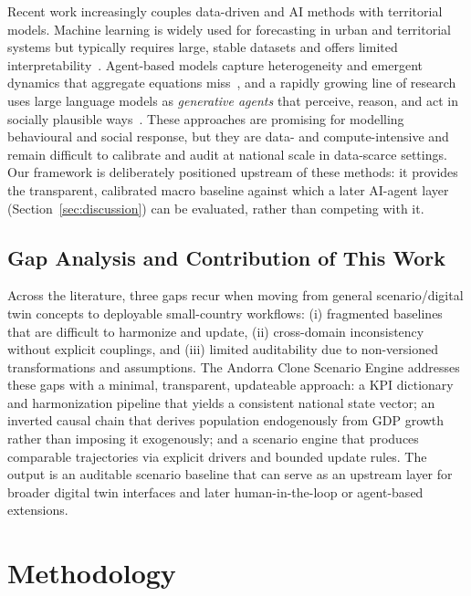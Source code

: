 \documentclass[urbansci,article,submit,pdftex,moreauthors]{Definitions/mdpi}
\begin{document}
Recent work increasingly couples data-driven and AI methods with territorial models.
Machine learning is widely used for forecasting in urban and territorial systems but
typically requires large, stable datasets and offers limited
interpretability~\cite{batty2018digitaltwins}. Agent-based models capture
heterogeneity and emergent dynamics that aggregate equations
miss~\cite{mason2004population,holtz2015agent}, and a rapidly growing line of research
uses large language models as \emph{generative agents} that perceive, reason, and act
in socially plausible
ways~\cite{adornetto2025generative,garcia2025simulating,carrero2024integrating,li2025hugagent}.
These approaches are promising for modelling behavioural and social response, but they
are data- and compute-intensive and remain difficult to calibrate and audit at
national scale in data-scarce settings. Our framework is deliberately positioned
upstream of these methods: it provides the transparent, calibrated macro baseline
against which a later AI-agent layer (Section~\ref{sec:discussion}) can be evaluated,
rather than competing with it.

\subsection{Gap Analysis and Contribution of This Work}

Across the literature, three gaps recur when moving from general
scenario/digital twin concepts to deployable small-country workflows: (i)
fragmented baselines that are difficult to harmonize and update, (ii)
cross-domain inconsistency without explicit couplings, and (iii) limited
auditability due to non-versioned transformations and assumptions. The Andorra
Clone Scenario Engine addresses these gaps with a minimal, transparent,
updateable approach: a KPI dictionary and harmonization pipeline that yields a
consistent national state vector; an inverted causal chain that derives
population endogenously from GDP growth rather than imposing it exogenously;
and a scenario engine that produces comparable trajectories via explicit drivers
and bounded update rules. The output is an auditable scenario baseline that can
serve as an upstream layer for broader digital twin interfaces and later
human-in-the-loop or agent-based extensions.

\section{Methodology}
\label{sec:methodology}
\end{document}
